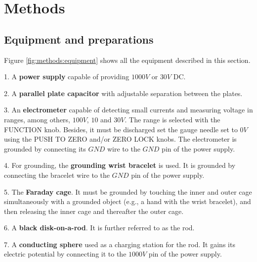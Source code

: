\section{Methods} \label{sec:methods}

\subsection{Equipment and preparations} \label{sec:methods:eq}

Figure \ref{fig:methods:equipment} shows all the equipment described in this section.

1. A \textbf{power supply} capable of providing $1000V$ or $30V$ DC.

2. A \textbf{parallel plate capacitor} with adjustable separation between the plates.

3. An \textbf{electrometer} capable of detecting small currents and measuring voltage in ranges, among others, $100V$, $10$ and $30V$. The range is selected with the FUNCTION knob. Besides, it must be discharged set the gauge needle set to $0V$ using the PUSH TO ZERO and/or ZERO LOCK knobs. The electrometer is grounded by connecting its $GND$ wire to the $GND$ pin of the power supply.

4. For grounding, the \textbf{grounding wrist bracelet} is used. It is grounded by connecting the bracelet wire to the $GND$ pin of the power supply.

5. The \textbf{Faraday cage}. It must be grounded by touching the inner and outer cage simultaneously with a grounded object (e.g., a hand with the wrist bracelet), and then releasing the inner cage and thereafter the outer cage.

6. A \textbf{black disk-on-a-rod}. It is further referred to as the rod.

7. A \textbf{conducting sphere} used as a charging station for the rod. It gains its electric potential by connecting it to the $1000V$ pin of the power supply.

